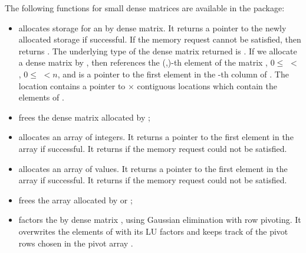 The following functions for small dense matrices are available in the
{\dense} package:
%
\begin{itemize}

\item {}
  \par {} allocates storage for an  by 
  dense matrix. It returns a pointer to the newly allocated storage if            
  successful. If the memory request cannot be satisfied, then    
   returns . The underlying type of the dense matrix 
  returned is . If we allocate a dense matrix  by 
  , then  references the (,)-th element   
  of the matrix , $0 \le$  $<$ , $0 \le$  $<n$, and  
  is a pointer to the first element in the -th column of . 
  The location  contains a pointer to  $\times$  contiguous 
  locations which contain the elements of .

\item {}
  \par {} frees the dense matrix  allocated by ;

\item {}
  \par {} allocates an array of  integers. 
  It returns a pointer to the first element in the array if successful. 
  It returns  if the memory request could not be satisfied.

\item {}
  \par {} allocates an array of   values. 
  It returns a pointer to the first element in the array if successful. 
  It returns  if the memory request could not be satisfied.

\item {}
  \par {} frees the array  allocated by  or ;

\item {}
  \par {} factors the  by  dense matrix ,
  using Gaussian elimination with row pivoting. 
  It overwrites the elements of  with its LU factors and keeps track of the
  pivot rows chosen in the pivot array .


\end{itemize}
